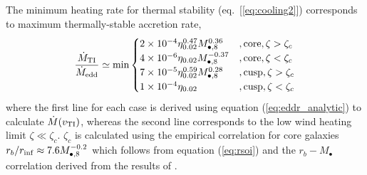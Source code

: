 \documentclass[usenatbib,fleqn]{mn2e}
\begin{document}
The minimum heating rate for thermal stability (eq.~[\ref{eq:cooling2}]) corresponds to maximum thermally-stable accretion rate,
\begin{align}
  \frac{\dot{M}_{\rm TI}}{\dot{M}_{\rm edd}} \simeq {\rm
    min}\begin{cases}
    2\times 10^{-4} \eta_{0.02}^{0.47} M_{\bullet,8}^{0.36} &, \text{core}, \zeta > \zeta_c\\
    4\times 10^{-6}\eta_{0.02}M_{\bullet,8}^{-0.37} &, \text{core}, \zeta < \zeta_c \\
    7\times 10^{-5} \eta_{0.02}^{0.59} M_{\bullet,8}^{0.28}    &, \text{cusp}, \zeta > \zeta_c\\
    1\times 10^{-4}\eta_{0.02}&, \text{cusp}, \zeta < \zeta_c
  \end{cases}
  \label{eq:Mdotmax}
\end{align}
where the first line for each case is derived using equation
(\ref{eq:eddr_analytic}) to calculate $\dot{M}(v_{\rm TI})$, whereas
the second line corresponds to the low wind heating limit $\zeta \ll
\zeta_c$.  $\zeta_c$ is calculated using the empirical correlation for
core galaxies $r_{b}/r_{\rm inf} \approx 7.6M_{\bullet,8}^{-0.2}$ which
follows from equation (\ref{eq:rsoi}) and the $r_b-M_{\bullet}$
correlation derived from the results of \citet{LauerFaber+:2007a}.
\end{document}
